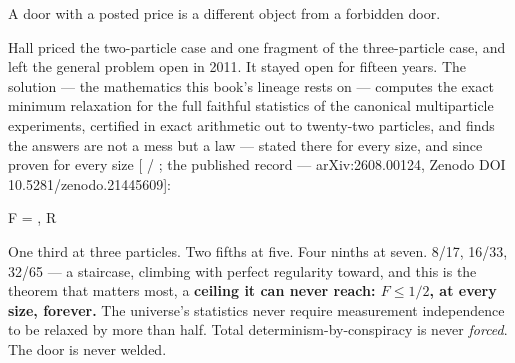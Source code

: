 A door with a posted price is a different object from a forbidden door.


Hall priced the two-particle case and one fragment of the three-particle
case, and left the general problem open in 2011. It stayed open for
fifteen years. The solution --- the mathematics this book's lineage rests
on --- computes the exact minimum relaxation for the full faithful
statistics of the canonical multiparticle experiments, certified in
exact arithmetic out to twenty-two particles, and finds the answers are
not a mess but a law --- stated there for every size, and since proven
for every size {[} / ; the published record --- arXiv:2608.00124,
Zenodo DOI 10.5281/zenodo.21445609{]}:

\begin{dispmath}F = , \qquad {} R \end{dispmath}

\noindent One third at three particles. Two fifths at five. Four ninths at seven.
8/17, 16/33, 32/65 --- a staircase, climbing with perfect regularity
toward, and this is the theorem that matters most, a \textbf{ceiling it can
never reach: \(F \le 1/2\), at every size, forever.} The universe's
statistics never require measurement independence to be relaxed by more
than half. Total determinism-by-conspiracy is never \emph{forced}. The
door is never welded.


